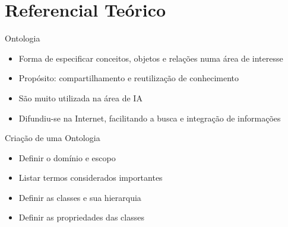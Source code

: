 \section{Referencial Teórico}\label{sec:referencial-teorico}
\begin{frame}{Ontologia}
	\begin{itemize}
		\setlength{\itemsep}{1em}
		\item<1-> Forma de especificar conceitos, objetos e relações numa área de interesse
		\item<1-> Propósito: compartilhamento e reutilização de conhecimento
		\item<1-> São muito utilizada na área de IA
		\item<1-> Difundiu-se na Internet, facilitando a busca e integração de informações
	\end{itemize}
\end{frame}

\begin{frame}{Criação de uma Ontologia}
	\begin{itemize}
		\setlength{\itemsep}{1em}
		\item<1-> Definir o domínio e escopo
		\item<1-> Listar termos considerados importantes
		\item<1-> Definir as classes e sua hierarquia
		\item<1-> Definir as propriedades das classes
	\end{itemize}
\end{frame}

